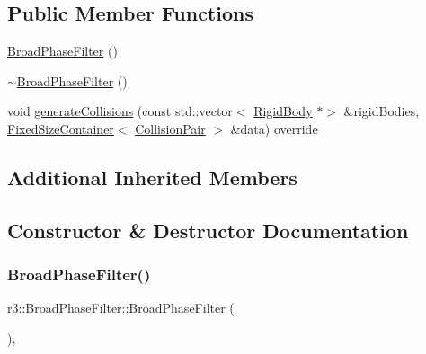 \subsection*{Public Member Functions}
\begin{DoxyCompactItemize}
\item 
\mbox{\hyperlink{classr3_1_1_broad_phase_filter_afcdb0ed5acb941bf16e284cb0031fe2e}{Broad\+Phase\+Filter}} ()
\item 
\mbox{\hyperlink{classr3_1_1_broad_phase_filter_a3c28ac36ed06766b235efad77ff9fd5d}{$\sim$\+Broad\+Phase\+Filter}} ()
\item 
void \mbox{\hyperlink{classr3_1_1_broad_phase_filter_a0435dc6468401e32bf151f84f52e80f8}{generate\+Collisions}} (const std\+::vector$<$ \mbox{\hyperlink{classr3_1_1_rigid_body}{Rigid\+Body}} $\ast$$>$ \&rigid\+Bodies, \mbox{\hyperlink{classr3_1_1_fixed_size_container}{Fixed\+Size\+Container}}$<$ \mbox{\hyperlink{classr3_1_1_collision_pair}{Collision\+Pair}} $>$ \&data) override
\end{DoxyCompactItemize}
\subsection*{Additional Inherited Members}


\subsection{Constructor \& Destructor Documentation}
\mbox{\label{classr3_1_1_broad_phase_filter_afcdb0ed5acb941bf16e284cb0031fe2e}} 
\subsubsection{\texorpdfstring{Broad\+Phase\+Filter()}{BroadPhaseFilter()}}
{\footnotesize\ttfamily r3\+::\+Broad\+Phase\+Filter\+::\+Broad\+Phase\+Filter (\begin{DoxyParamCaption}{ }\end{DoxyParamCaption})\hspace{0.3cm}{\ttfamily [explicit]}, {\ttfamily [default]}}

\mbox{\label{classr3_1_1_broad_phase_filter_a3c28ac36ed06766b235efad77ff9fd5d}} 

